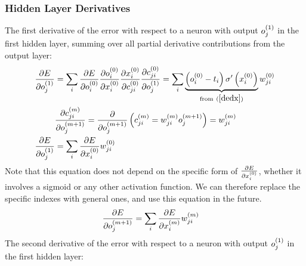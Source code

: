 \subsubsection{Hidden Layer Derivatives}
The first derivative of the error with respect to a neuron with output $o_{j}^{(1)}$ in the first hidden layer, summing over all partial derivative contributions from the output layer:
\begin{align}
\pdv{E}{o_{j}^{(1)}} &= 
\sum_i
\pdv{E}{o_{i}^{(0)}}
\pdv{o_{i}^{(0)}}{x_{i}^{(0)}}
\pdv{x_{i}^{(0)}}{c_{ji}^{(0)}}
\pdv{c_{ji}^{(0)}}{o_{j}^{(1)}}
= 
\sum_i
\underbrace{\left(o_{i}^{(0)} - t_{i}\right)\sigma^{\prime}\left(x_{i}^{(0)}\right)}
_{\text{from} \ (\ref{dedx})}
w_{ji}^{(0)}
\\
&\pdv{{c_{ji}^{(m)}}}{{o_{j}^{(m+1)}}} = \pdv{}{{o_{j}^{(m+1)}}}\left(c_{ji}^{(m)} = w_{ji}^{(m)}o_{j}^{(m+1)}\right) = w_{ji}^{(m)}\label{dcdo}
\\
\pdv{E}{o_{j}^{(1)}} &= \sum_i\pdv{E}{x_{i}^{(0)}}w_{ji}^{(0)}
\end{align}
Note that this equation does not depend on the specific form of $\pdv{E}{x_{i}^{(0)}}$, whether it involves a sigmoid or any other activation function. We can therefore replace the specific indexes with general ones, and use this equation in the future.
\begin{align}
\pdv{E}{o_{j}^{(m+1)}} &= \sum_i\pdv{E}{x_{i}^{(m)}}w_{ji}^{(m)}\label{dedo_general}
\end{align}
The second derivative of the error with respect to a neuron with output $o_{j}^{(1)}$ in the first hidden layer:
